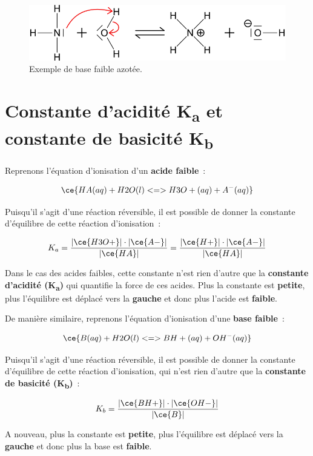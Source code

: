 \documentclass[
  11pt,
  a4paper,
  openany]{book}
\begin{document}
\begin{figure}

{\centering \includegraphics[width=0.5\linewidth]{images/acides-bases-3} 

}

\caption{Exemple de base faible azotée.}\label{fig:acides-bases-3}
\end{figure}

\hypertarget{constante-dacidituxe9-ka-et-constante-de-basicituxe9-kb}{%
\section{\texorpdfstring{Constante d'acidité K\textsubscript{a} et constante de basicité K\textsubscript{b}}{Constante d'acidité Ka et constante de basicité Kb}}\label{constante-dacidituxe9-ka-et-constante-de-basicituxe9-kb}}

Reprenons l'équation d'ionisation d'un \textbf{acide faible}~:

\[
\ce{HA(aq) + H2O(l) <=> H3O+(aq) + A^{-}(aq)}
\]

Puisqu'il s'agit d'une réaction réversible, il est possible de donner la constante d'équilibre de cette réaction d'ionisation~:

\[
K_a = \frac{|\ce{H3O+}| \cdot |\ce{A-}|}{|\ce{HA}|} =  \frac{|\ce{H+}| \cdot |\ce{A-}|}{|\ce{HA}|}
\]

Dans le cas des acides faibles, cette constante n'est rien d'autre que la \textbf{constante d'acidité (K\textsubscript{a})} qui quantifie la force de ces acides. Plus la constante est \textbf{petite}, plus l'équilibre est déplacé vers la \textbf{gauche} et donc plus l'acide est \textbf{faible}.

De manière similaire, reprenons l'équation d'ionisation d'une \textbf{base faible}~:

\[
\ce{B(aq) + H2O(l) <=> BH+(aq) + OH^{-}(aq)}
\]

Puisqu'il s'agit d'une réaction réversible, il est possible de donner la constante d'équilibre de cette réaction d'ionisation, qui n'est rien d'autre que la \textbf{constante de basicité (K\textsubscript{b})}~:

\[
K_b = \frac{|\ce{BH+}| \cdot |\ce{OH-}|}{|\ce{B}|}
\]

A nouveau, plus la constante est \textbf{petite}, plus l'équilibre est déplacé vers la \textbf{gauche} et donc plus la base est \textbf{faible}.
\end{document}
